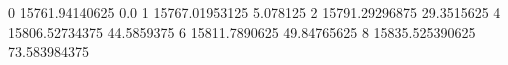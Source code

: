 0 15761.94140625 0.0
1 15767.01953125 5.078125
2 15791.29296875 29.3515625
4 15806.52734375 44.5859375
6 15811.7890625 49.84765625
8 15835.525390625 73.583984375
